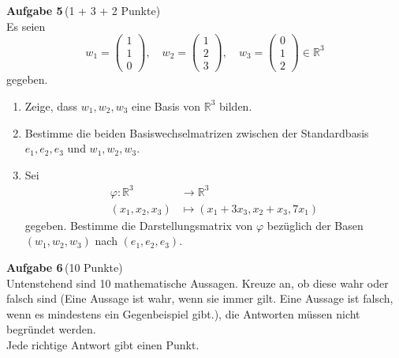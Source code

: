 \documentclass[11pt]{report} %
\newcommand\bR{\mathbb{R}}
\begin{document}
	\medskip\noindent
	{\bf Aufgabe 5}\,(1 + 3 + 2 Punkte)\\
		Es seien
		\begin{equation*}
			w_1 = \begin{pmatrix} 1 \\ 1 \\ 0 \end{pmatrix}, \quad w_2 = \begin{pmatrix} 1 \\ 2 \\ 3 \end{pmatrix}, \quad w_3 = \begin{pmatrix} 0 \\ 1 \\ 2 \end{pmatrix} \in \bR^3
		\end{equation*}
		gegeben.
		\begin{enumerate}
			\item 
				Zeige, dass $w_1, w_2, w_3$ eine Basis von $\bR^3$ bilden. 
				
			\item 
				Bestimme die beiden Basiswechselmatrizen zwischen der Standardbasis $e_1, e_2, e_3$ und $w_1, w_2, w_3$.
				
			\item 
				Sei
				\begin{align*}
					\varphi: \bR^3 &\rightarrow \bR^3\\
					(x_1, x_2, x_3) &\mapsto (x_1 + 3x_3, x_2 + x_3, 7x_1)
				\end{align*}
				gegeben. Bestimme die Darstellungsmatrix von $\varphi$ bezüglich der Basen $(w_1, w_2, w_3)$ nach $(e_1, e_2, e_3)$.
		\end{enumerate}
		
	\medskip\noindent
	{\bf Aufgabe 6}\,(10 Punkte)\\
		Untenstehend sind 10 mathematische Aussagen. Kreuze an, ob diese wahr oder falsch sind (Eine Aussage ist wahr, wenn sie immer gilt. Eine Aussage ist falsch, wenn es mindestens ein Gegenbeispiel gibt.), die Antworten müssen nicht begründet werden.\\
		Jede richtige Antwort gibt einen Punkt.\\
		
\end{document}
